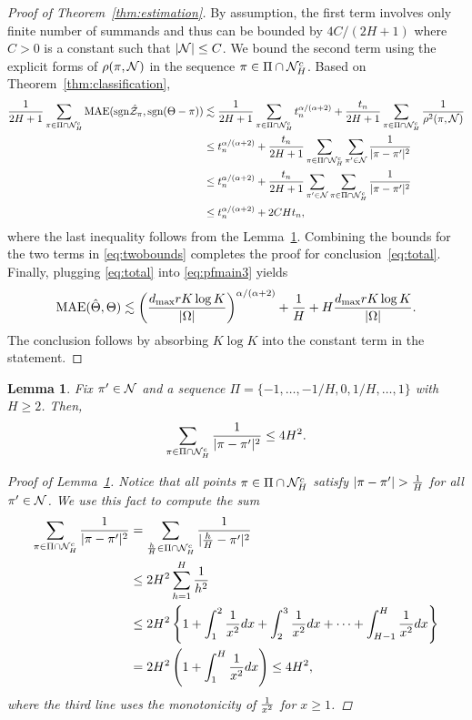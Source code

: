 \documentclass[11pt]{article}
\theoremstyle{plain}
\newtheorem{lem}{Lemma}
\theoremstyle{definition}
\def\sign{\textup{sgn}}
\begin{document}
\begin{proof}[Proof of Theorem~\ref{thm:estimation}]
By assumption, the first term involves only finite number of summands and thus can be bounded by $4C/ (2H+1)$ where $C>0$ is a constant such that $|\mathcal{N}|\leq C$.  We bound the second term using the explicit forms of $\rho(\pi, \mathcal{N})$ in the sequence $\pi \in\Pi\cap \mathcal{N}_H^c$. Based on Theorem~\ref{thm:classification}, 
\begin{align}
{1\over 2H+1}\sum_{\pi \in \Pi\cap \tN_H^c} \textup{MAE}(\sign \hat \tZ_\pi, \sign (\Theta-\pi)) &\lesssim  {1\over 2H+1}\sum_{\pi\in \Pi\cap \tN_H^c} t_n^{\alpha/(\alpha+2)}+{t_n\over 2H+1}\sum_{\pi \in \Pi\cap \tN_H^c}{1\over \rho^2(\pi, \tN)}\\
&\leq t_n^{\alpha/(\alpha+2)}+{t_n\over 2H+1} \sum_{\pi \in \Pi\cap \tN_H^c} \sum_{\pi' \in \tN}{1\over |\pi-\pi'|^2}\\
&\leq  t_n^{\alpha/(\alpha+2)}+{t_n\over 2H+1} \sum_{\pi'\in \tN} \sum_{\pi \in \Pi\cap \tN_H^c}{1\over |\pi-\pi'|^2}\\
&\leq t_n^{\alpha/(\alpha+2)}+ 2CHt_n,
\end{align}
where the last inequality follows from the Lemma~\ref{lem:H}.  Combining the bounds for the two terms in \eqref{eq:twobounds} completes the proof for conclusion~\eqref{eq:total}. Finally, plugging \eqref{eq:total} into \eqref{eq:pfmain3} yields
\begin{align}
\text{MAE}(\hat\Theta,\Theta)\lesssim \left(d_{\max}rK\log K\over |\Omega|\right)^{\alpha/(\alpha+2)}+\frac{1}{H}+H{d_{\max}rK\log K\over |\Omega|}.
 \end{align}
The conclusion follows by absorbing $K\log K$ into the constant term in the statement. 
\end{proof}


\begin{lem}\label{lem:H}
Fix $\pi'\in\mathcal{N}$ and a sequence $\Pi=\{-1,\ldots,-1/H,0,1/H,\ldots,1\}$ with $H\geq 2$. Then, 
\[
\sum_{\pi \in \Pi\cap \mathcal{N}_H^c}{1\over 
|\pi-\pi'|^2}\leq 4H^2. 
\]
\begin{proof}[Proof of Lemma~\ref{lem:H}]
Notice that all points $\pi\in\Pi\cap\mathcal{N}_H^c$ satisfy $|\pi-\pi'|>{1\over H}$ for all $\pi'\in\mathcal{N}$. We use this fact to compute the sum
\begin{align}
   \sum_{\pi \in \Pi\cap \mathcal{N}_H^c}{1\over |\pi-\pi'|^2}&= \sum_{\frac{h}{H}\in\Pi\cap \mathcal{N}_H^c } {1\over |\frac{h}{H}-\pi'|^2}\\
   &\leq 2H^2\sum_{h=1}^{H}{1 \over h^2}\\
 &\leq 2H^2\left\{ 1+\int_{1}^2{1\over x^2}dx+ \int_{2}^3{1\over x^2}dx+\cdots + \int_{H-1}^H{1\over x^2}dx\right\}\\
&= 2H^2\left(1+\int^{H}_{1}{1\over x^2}dx\right) \leq 4H^2,
\end{align}
 where the third line uses the monotonicity of ${1\over x^2}$ for $x\geq 1$. 
 \end{proof}
\end{lem}
\end{document}
